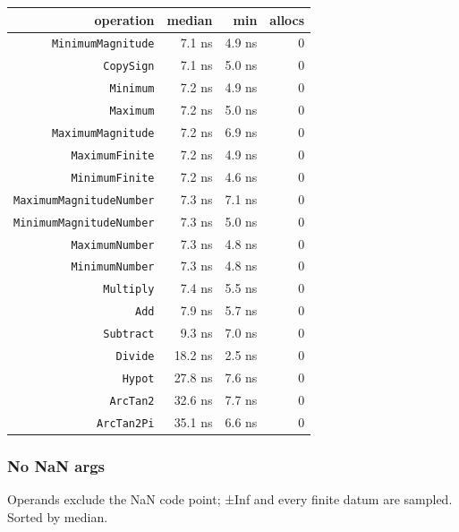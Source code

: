 \begin{table}[h]
\centering
\begin{tabulary}{\linewidth}{R R R R}
\toprule
operation & median & min & allocs \\
\toprule
\texttt{MinimumMagnitude} & 7.1 ns & 4.9 ns & 0 \\
\texttt{CopySign} & 7.1 ns & 5.0 ns & 0 \\
\texttt{Minimum} & 7.2 ns & 4.9 ns & 0 \\
\texttt{Maximum} & 7.2 ns & 5.0 ns & 0 \\
\texttt{MaximumMagnitude} & 7.2 ns & 6.9 ns & 0 \\
\texttt{MaximumFinite} & 7.2 ns & 4.9 ns & 0 \\
\texttt{MinimumFinite} & 7.2 ns & 4.6 ns & 0 \\
\texttt{MaximumMagnitudeNumber} & 7.3 ns & 7.1 ns & 0 \\
\texttt{MinimumMagnitudeNumber} & 7.3 ns & 5.0 ns & 0 \\
\texttt{MaximumNumber} & 7.3 ns & 4.8 ns & 0 \\
\texttt{MinimumNumber} & 7.3 ns & 4.8 ns & 0 \\
\texttt{Multiply} & 7.4 ns & 5.5 ns & 0 \\
\texttt{Add} & 7.9 ns & 5.7 ns & 0 \\
\texttt{Subtract} & 9.3 ns & 7.0 ns & 0 \\
\texttt{Divide} & 18.2 ns & 2.5 ns & 0 \\
\texttt{Hypot} & 27.8 ns & 7.6 ns & 0 \\
\texttt{ArcTan2} & 32.6 ns & 7.7 ns & 0 \\
\texttt{ArcTan2Pi} & 35.1 ns & 6.6 ns & 0 \\
\bottomrule
\end{tabulary}

\end{table}



\subsubsection{No NaN args}



\label{5394694367249928840}{}


Operands exclude the NaN code point; ±Inf and every finite datum are sampled. Sorted by median.




